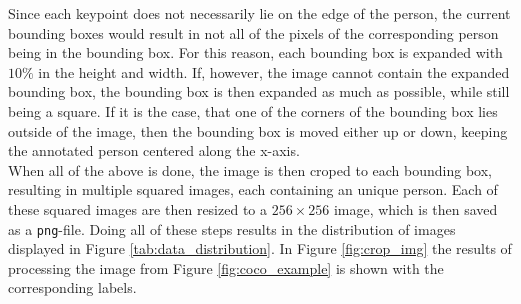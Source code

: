 \documentclass[main.tex]{subfiles}
\begin{document}
Since each keypoint does not necessarily lie on the edge of the person, the current bounding boxes would result in not all of the pixels of the corresponding person being in the bounding box. For this reason, each bounding box is expanded with $10\%$ in the height and width. If, however, the image cannot contain the expanded bounding box, the bounding box is then expanded as much as possible, while still being a square. If it is the case, that one of the corners of the bounding box lies outside of the image, then the bounding box is moved either up or down, keeping the annotated person centered along the x-axis. \\
When all of the above is done, the image is then croped to each bounding box, resulting in multiple squared images, each containing an unique person. Each of these squared images are then resized to a $256 \times 256$ image, which is then saved as a \texttt{png}-file. Doing all of these steps results in the distribution of images displayed in Figure \ref{tab:data_distribution}. In Figure \ref{fig:crop_img} the results of processing the image from Figure \ref{fig:coco_example} is shown with the corresponding labels. 
\end{document}
